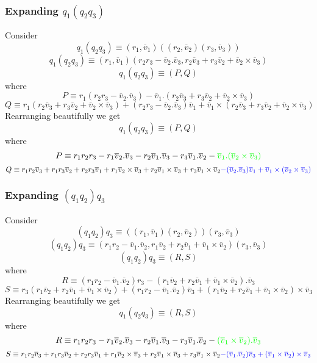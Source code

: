 \documentclass[12pt]{article}
\newcommand{\vv}[1]{\overline{v}_{#1}}
\begin{document}
\subsubsection*{Expanding $q_1(q_2q_3)$}
Consider
\[
  q_1(q_2q_3) \equiv (r_1, \vv{1}) ((r_2, \vv{2})(r_3, \vv{3}))
\]
\[
  q_1(q_2q_3) \equiv (r_1, \vv{1}) (r_2r_3 - \vv{2}.\vv{3}, r_2 \vv{3} + r_3 \vv{2} + \vv{2}\times\vv{3})
\]
\[
  q_1(q_2q_3) \equiv (P, Q)
\]
where
\[
  P \equiv r_1(r_2r_3 - \vv{2}.\vv{3}) - \vv{1}.(r_2 \vv{3} + r_3 \vv{2} + \vv{2}\times\vv{3})
\]
\[
  Q \equiv  r_1(r_2 \vv{3} + r_3 \vv{2} + \vv{2}\times\vv{3})
    + (r_2r_3 - \vv{2}.\vv{3})\vv{1}
    + \vv{1} \times (r_2 \vv{3} + r_3 \vv{2} + \vv{2}\times\vv{3})
\]
Rearranging beautifully we get
\[
  q_1(q_2q_3) \equiv (P, Q)
\]
where
\[
  P \equiv r_1r_2r_3 - r_1\vv{2}.\vv{3} - r_2\vv{1}.\vv{3} - r_3\vv{1}.\vv{2} - {\color{green} \vv{1} . (\vv{2}\times\vv{3})}
\]
\[
  Q \equiv
  r_1r_2\vv{3}
  + r_1r_3\vv{2}
  + r_2r_3\vv{1}
  + r_1 \vv{2}\times\vv{3}
  + r_2 \vv{1}\times\vv{3}
  + r_3 \vv{1}\times\vv{2}
  {\color{blue}
  - (\vv{2}.\vv{3})\vv{1}
  + \vv{1} \times (\vv{2}\times\vv{3})}
\]

\subsubsection*{Expanding $(q_1q_2)q_3$}
Consider
\[
  (q_1q_2)q_3 \equiv ((r_1, \vv{1})(r_2, \vv{2}))(r_3, \vv{3})
\]
\[
  (q_1q_2)q_3 \equiv (r_1r_2 - \vv{1}.\vv{2}, r_1 \vv{2} + r_2 \vv{1} + \vv{1}\times\vv{2}) (r_3, \vv{3})
\]
\[
  (q_1q_2)q_3 \equiv (R, S)
\]
where
\[
  R \equiv (r_1r_2 - \vv{1}.\vv{2})r_3 - (r_1 \vv{2} + r_2 \vv{1} + \vv{1}\times\vv{2}).\vv{3}
\]
\[
  S \equiv
    r_3(r_1 \vv{2} + r_2 \vv{1} + \vv{1}\times\vv{2})
    + (r_1r_2 - \vv{1}.\vv{2})\vv{3}
    + (r_1 \vv{2} + r_2 \vv{1} + \vv{1}\times\vv{2}) \times \vv{3}
\]
Rearranging beautifully we get
\[
  q_1(q_2q_3) \equiv (R, S)
\]
where
\[
  R \equiv r_1r_2r_3 - r_1\vv{2}.\vv{3} - r_2\vv{1}.\vv{3} - r_3\vv{1}.\vv{2} - {\color{green} (\vv{1}\times\vv{2}).\vv{3}}
\]
\[
  S \equiv
  r_1r_2\vv{3}
  + r_1r_3\vv{2}
  + r_2r_3\vv{1}
  + r_1 \vv{2}\times\vv{3}
  + r_2 \vv{1}\times\vv{3}
  + r_3 \vv{1}\times\vv{2}
  {\color{blue}
  - (\vv{1}.\vv{2})\vv{3}
  + (\vv{1}\times\vv{2})\times\vv{3}}
\]
\end{document}
